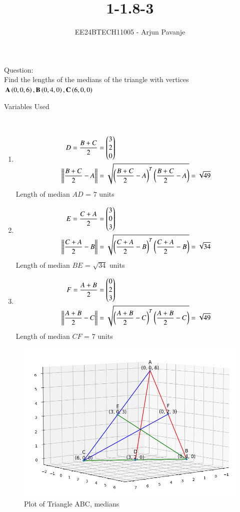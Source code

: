 \documentclass[journal]{IEEEtran}
\begin{document}

\vspace{3cm}

\title{1-1.8-3}
\author{EE24BTECH11005 - Arjun Pavanje
}
{\let\newpage\relax\maketitle}
Question:\\
Find the lengths of the medians of the triangle with vertices $\mathbf{A}\left(0,0,6\right),\mathbf{B}\left(0,4,0\right),\mathbf{C}\left(6,0,0\right)$\\
\solution
\begin{table}[h!]    
  \centering
  
  \caption{Variables Used}
  \label{tab1-1.5-29}
\end{table}\\
\begin{enumerate}
	\item
\begin{align}
	D = \frac{B+C}{2} &= \begin{pmatrix}
		3\\
		2\\
		0
	\end{pmatrix}\\
	\left\lVert\frac{B+C}{2}-A\right\rVert &= \sqrt{\left(\frac{B+C}{2}-A\right)^T \left(\frac{B+C}{2}-A\right)} = \sqrt{49}
\end{align}
Length of median $AD$ = $7$ units
\item
\begin{align}
	E = \frac{C+A}{2} &= \begin{pmatrix}
		3\\
		0\\
		3
	\end{pmatrix}\\
	\left\lVert\frac{C+A}{2}-B\right\rVert &= \sqrt{\left(\frac{C+A}{2}-B\right)^T \left(\frac{C+A}{2}-B\right)} = \sqrt{34}
\end{align}
Length of median $BE$ = $\sqrt{34}$ units
\item
\begin{align}
	F = \frac{A+B}{2} &= \begin{pmatrix}
		0\\
		2\\
		3
	\end{pmatrix}\\
	\left\lVert\frac{A+B}{2}-C\right\rVert &= \sqrt{\left(\frac{A+B}{2}-C\right)^T \left(\frac{A+B}{2}-C\right)} = \sqrt{49}
\end{align}
Length of median $CF$ = $7$ units
		\end{enumerate}
\begin{figure}[h!]
   \centering
   \includegraphics[width = 0.7\linewidth]{figs/Figure_1.png}
   \caption{Plot of Triangle ABC, medians}
   \label{stemplot}
\end{figure}
\end{document}
